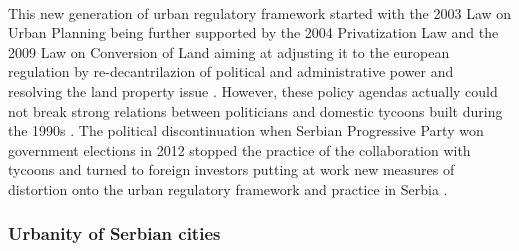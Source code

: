 \documentclass[11pt]{report}
\begin{document}
\\
This new generation of urban regulatory framework started with the 2003 Law on Urban Planning being further supported by the 2004 Privatization Law  and the 2009 Law on Conversion of Land aiming at adjusting it to the european regulation by re-decantrilazion of political and administrative power and resolving the land property issue \cite{Cagic 2014}. However, these policy agendas actually could not break strong relations between politicians and domestic tycoons built during the 1990s \cite{Peric 2016}.
The political discontinuation when Serbian Progressive Party won government elections in 2012 stopped the practice of the collaboration with tycoons and turned to foreign investors putting at work new measures of distortion onto the urban regulatory framework and practice in Serbia \cite{Peric 2016}.
            
\subsubsection{Urbanity of Serbian cities}
\end{document}
